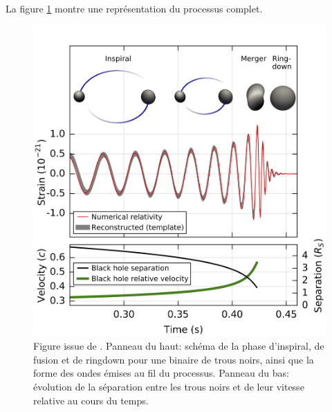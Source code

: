 La figure \ref{fig:inspiral} montre une représentation du processus complet.
%
\begin{figure}
  \centering
  \includegraphics[width=0.5\linewidth]{sectionGW/inspiral.png}
  \caption{Figure issue de \cite{gw150914}. Panneau du haut: schéma de la phase d'inspiral, de fusion et de ringdown pour une binaire de trous noirs, ainsi que la forme des ondes émises au fil du processus. Panneau du bas: évolution de la séparation entre les trous noirs et de leur vitesse relative au cours du temps.}
  \label{fig:inspiral}
\end{figure}
%


